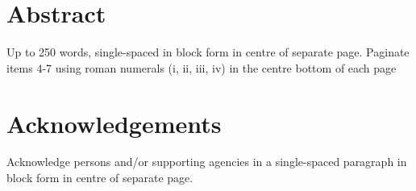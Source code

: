 \section*{Abstract}

Up to 250 words, single-spaced in block form in centre of separate page.
Paginate items 4-7 using roman numerals (i, ii, iii, iv) in the centre
bottom of each page

\section*{Acknowledgements}

Acknowledge persons and/or supporting agencies in a single-spaced
paragraph in block form in centre of separate page. 